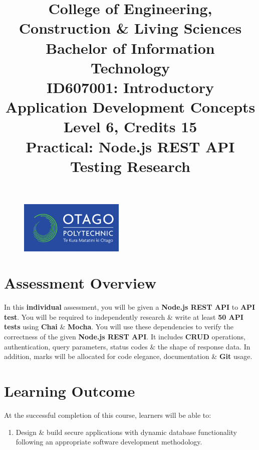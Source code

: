 \documentclass{article}
\author{}
\begin{document}
\begin{figure}
    \centering
    \includegraphics[width=50mm]{../img/logo.png}
\end{figure}

\title{College of Engineering, Construction \& Living Sciences\\Bachelor of Information Technology\\ID607001: Introductory Application Development Concepts\\Level 6, Credits 15\\\textbf{Practical: Node.js REST API Testing Research}}
\date{}
\maketitle

\section*{Assessment Overview}
In this \textbf{individual} assessment, you will be given a \textbf{Node.js REST API} to \textbf{API test}. You will be required to independently research \& write at least \textbf{50 API tests} using \textbf{Chai} \& \textbf{Mocha}. You will use these dependencies to verify the correctness of the given \textbf{Node.js REST API}. It includes \textbf{CRUD} operations, authentication, query parameters, status codes \& the shape of response data. In addition, marks will be allocated for code elegance, documentation \& \textbf{Git} usage. 

\section*{Learning Outcome}
At the successful completion of this course, learners will be able to:
\begin{enumerate}
    \item Design \& build secure applications with dynamic database functionality following an appropriate software development methodology.
\end{enumerate}
\end{document}
